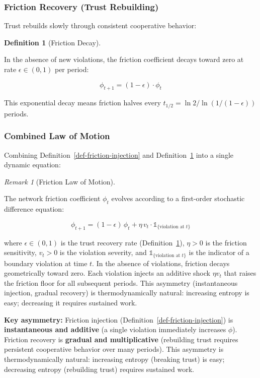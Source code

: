 \documentclass[11pt]{article}
\theoremstyle{plain}
\theoremstyle{definition}
\newtheorem{definition}{Definition}
\theoremstyle{remark}
\newtheorem{remark}{Remark}
\let\origsubsubsection\subsubsection
\renewcommand{\subsubsection}{\needspace{4\baselineskip}\origsubsubsection}
\begin{document}
\subsubsection{Friction Recovery (Trust
Rebuilding)}\label{friction-recovery-trust-rebuilding}

Trust rebuilds slowly through consistent cooperative behavior:

\begin{definition}[Friction Decay]
\label{def-friction-decay}

In the absence of new violations, the friction coefficient decays toward zero at rate $\epsilon \in (0, 1)$ per period:

$$\phi_{t+1} = (1 - \epsilon) \cdot \phi_t$$

This exponential decay means friction halves every $t_{1/2} = \ln 2 / \ln(1/(1 - \epsilon))$ periods.
\end{definition}

\subsubsection{Combined Law of Motion}\label{combined-law-of-motion}

Combining Definition~\ref{def-friction-injection} and
Definition~\ref{def-friction-decay} into a single dynamic equation:

\begin{remark}[Friction Law of Motion]
\label{rmk-friction-law-of-motion}

The network friction coefficient $\phi_t$ evolves according to a first-order stochastic difference equation:

$$\phi_{t+1} = (1 - \epsilon)\,\phi_t + \eta\,v_t \cdot \mathds{1}_{\{\text{violation at } t\}}$$

where $\epsilon \in (0,1)$ is the trust recovery rate (Definition~\ref{def-friction-decay}), $\eta > 0$ is the friction sensitivity, $v_t > 0$ is the violation severity, and $\mathds{1}_{\{\text{violation at } t\}}$ is the indicator of a boundary violation at time $t$. In the absence of violations, friction decays geometrically toward zero. Each violation injects an additive shock $\eta v_t$ that raises the friction floor for all subsequent periods. This asymmetry (instantaneous injection, gradual recovery) is thermodynamically natural: increasing entropy is easy; decreasing it requires sustained work.
\end{remark}

\textbf{Key asymmetry:} Friction injection
(Definition~\ref{def-friction-injection}) is \textbf{instantaneous and
additive} (a single violation immediately increases \(\phi\)). Friction
recovery is \textbf{gradual and multiplicative} (rebuilding trust
requires persistent cooperative behavior over many periods). This
asymmetry is thermodynamically natural: increasing entropy (breaking
trust) is easy; decreasing entropy (rebuilding trust) requires sustained
work.
\end{document}
